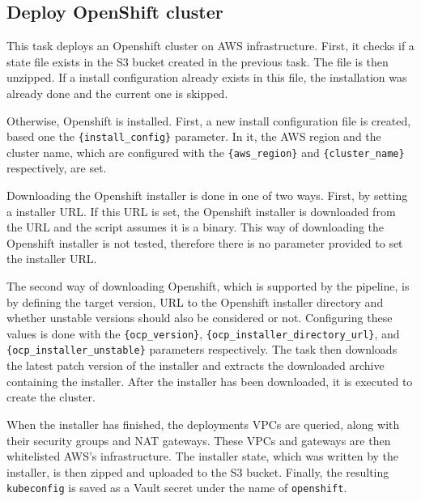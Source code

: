\subsection{Deploy OpenShift cluster}\label{subsec:deploy-openshift-cluster}

This task deploys an Openshift cluster on AWS infrastructure.
First, it checks if a state file exists in the S3 bucket created in the previous task.
The file is then unzipped.
If a install configuration already exists in this file, the installation was already done and the current one is skipped.

Otherwise, Openshift is installed.
First, a new install configuration file is created, based one the \verb|{install_config}| parameter.
In it, the AWS region and the cluster name, which are configured with the \verb|{aws_region}| and \verb|{cluster_name}| respectively, are set.

Downloading the Openshift installer is done in one of two ways.
First, by setting a installer URL.
If this URL is set, the Openshift installer is downloaded from the URL and the script assumes it is a binary.
This way of downloading the Openshift installer is not tested, therefore there is no parameter provided to set the installer URL.

The second way of downloading Openshift, which is supported by the pipeline, is by defining the target version, URL to the Openshift installer directory and whether unstable versions should also be considered or not.
Configuring these values is done with the \verb|{ocp_version}|, \verb|{ocp_installer_directory_url}|, and \verb|{ocp_installer_unstable}| parameters respectively.
The task then downloads the latest patch version of the installer and extracts the downloaded archive containing the installer.
After the installer has been downloaded, it is executed to create the cluster.

When the installer has finished, the deployments VPCs are queried, along with their security groups and NAT gateways.
These VPCs and gateways are then whitelisted AWS's infrastructure.
The installer state, which was written by the installer, is then zipped and uploaded to the S3 bucket.
Finally, the resulting \verb|kubeconfig| is saved as a Vault secret under the name of \verb|openshift|.

